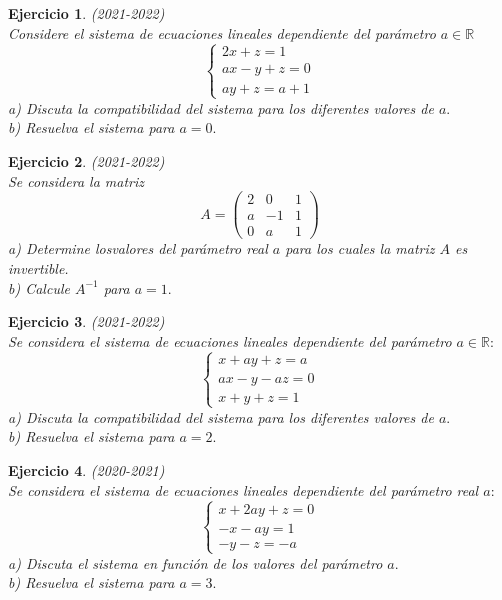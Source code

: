 \documentclass[12pt, a4paper]{amsart}
\newtheorem{ejer}{Ejercicio}
\begin{document}
\begin{ejer}\em (2021-2022)\\
Considere el sistema de ecuaciones lineales dependiente del parámetro  $a\in\mathbb{R}$
\begin{equation*}
\left \{ \begin{matrix} 2x+z=1
\\ ax-y+z=0
\\ay+z=a+1 \end{matrix}\right. 
\end{equation*}
a) Discuta la compatibilidad del sistema para los diferentes valores de $a.$\\
b) Resuelva el sistema para $a = 0.$
\end{ejer}

\begin{ejer}\em (2021-2022)\\
Se considera la matriz
\[A=\begin{pmatrix}
2 & 0 & 1
\\a & -1 & 1
\\ 0 & a & 1 \end{pmatrix}\]
a) Determine losvalores del parámetro real $a$ para los cuales la matriz $A$ es invertible.\\
b) Calcule $A^{-1}$ para $a = 1.$
\end{ejer}

\begin{ejer}\em (2021-2022)\\
Se considera el sistema de ecuaciones lineales dependiente del parámetro $a\in\mathbb{R}:$
\begin{equation*}
\left \{ \begin{matrix} x+ay+z=a
\\ ax-y-az=0
\\x+y+z=1 \end{matrix}\right. 
\end{equation*}
a) Discuta la compatibilidad del sistema para los diferentes valores de $a.$\\
b) Resuelva el sistema para $a = 2.$
\end{ejer}

\begin{ejer}\em (2020-2021)\\
Se considera el sistema de ecuaciones lineales dependiente del parámetro real $a:$
\[
\left \{ \begin{matrix}
x+2ay+z=0
\\ -x-ay=1
\\  -y-z=-a
\end{matrix}  \right.
\]
a) Discuta el sistema en función de los valores del parámetro $a.$\\
b) Resuelva el sistema para $a = 3.$

\end{ejer}
\end{document}
